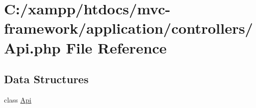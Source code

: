 \hypertarget{_api_8php}{}\section{C\+:/xampp/htdocs/mvc-\/framework/application/controllers/\+Api.php File Reference}
\label{_api_8php}
\subsection*{Data Structures}
\begin{DoxyCompactItemize}
\item 
class \hyperlink{class_api}{Api}
\end{DoxyCompactItemize}
